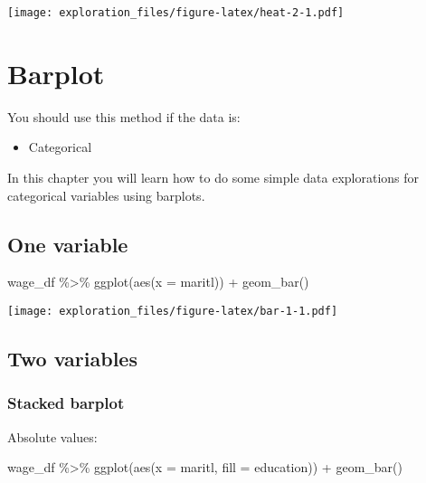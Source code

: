 \documentclass[
]{book}
\newenvironment{Shaded}{\begin{snugshade}}{\end{snugshade}}
\newcommand{\AttributeTok}[1]{\textcolor[rgb]{0.77,0.63,0.00}{#1}}
\newcommand{\FunctionTok}[1]{\textcolor[rgb]{0.00,0.00,0.00}{#1}}
\newcommand{\NormalTok}[1]{#1}
\newcommand{\SpecialCharTok}[1]{\textcolor[rgb]{0.00,0.00,0.00}{#1}}
\providecommand{\tightlist}{%
  \setlength{\itemsep}{0pt}\setlength{\parskip}{0pt}}
\begin{document}
\texttt{[image: exploration\_files/figure-latex/heat-2-1.pdf]}

\hypertarget{barplot}{%
\chapter{Barplot}\label{barplot}}

You should use this method if the data is:

\begin{itemize}
\tightlist
\item
  Categorical
\end{itemize}

In this chapter you will learn how to do some simple data explorations for categorical variables using barplots.

\hypertarget{one-variable}{%
\section{One variable}\label{one-variable}}

\begin{Shaded}
\begin{Highlighting}[]
\NormalTok{wage\_df }\SpecialCharTok{\%\textgreater{}\%} 
  \FunctionTok{ggplot}\NormalTok{(}\FunctionTok{aes}\NormalTok{(}\AttributeTok{x =}\NormalTok{ maritl)) }\SpecialCharTok{+}
  \FunctionTok{geom\_bar}\NormalTok{()}
\end{Highlighting}
\end{Shaded}

\texttt{[image: exploration\_files/figure-latex/bar-1-1.pdf]}

\hypertarget{two-variables}{%
\section{Two variables}\label{two-variables}}

\hypertarget{stacked-barplot}{%
\subsection{Stacked barplot}\label{stacked-barplot}}

Absolute values:

\begin{Shaded}
\begin{Highlighting}[]
\NormalTok{wage\_df }\SpecialCharTok{\%\textgreater{}\%} 
  \FunctionTok{ggplot}\NormalTok{(}\FunctionTok{aes}\NormalTok{(}\AttributeTok{x =}\NormalTok{ maritl, }\AttributeTok{fill =}\NormalTok{ education)) }\SpecialCharTok{+} 
  \FunctionTok{geom\_bar}\NormalTok{()}
\end{Highlighting}
\end{Shaded}
\end{document}
